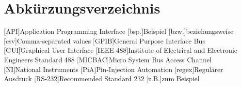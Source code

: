 \section*{Abkürzungsverzeichnis}
\begin{acronym}[MICBAC]
[API]{Application Programming Interface}
[bsp.]{Beispiel}
[bzw.]{beziehungsweise}
[csv]{Comma-separated values}
[GPIB]{General Purpose Interface Bus}
[GUI]{Graphical User Interface}
[IEEE 488]{Institute of Electrical and Electronic Engineers Standard 488}
[MICBAC]{Micro System Bus Access Channel}
[NI]{National Instruments}
[PiA]{Pin-Injection Automation}
[regex]{Regulärer Ausdruck}
[RS-232]{Recommended Standard 232}
[z.B.]{zum Beispiel}
\end{acronym}